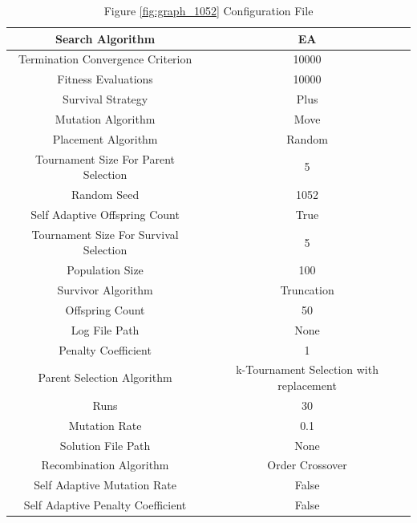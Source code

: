 \documentclass{standalone}
\begin{document}
\begin{table}[!htb]
	\centering
	\caption{Figure \ref{fig:graph_1052} Configuration File}
	\label{tab:graph_1052}
	\begin{tabular}{| c | c |}
		\hline
		Search Algorithm		& EA		 \\
		\hline
		Termination Convergence Criterion		& 10000		 \\
		\hline
		Fitness Evaluations		& 10000		 \\
		\hline
		Survival Strategy		& Plus		 \\
		\hline
		Mutation Algorithm		& Move		 \\
		\hline
		Placement Algorithm		& Random		 \\
		\hline
		Tournament Size For Parent Selection		& 5		 \\
		\hline
		Random Seed		& 1052		 \\
		\hline
		Self Adaptive Offspring Count		& True		 \\
		\hline
		Tournament Size For Survival Selection		& 5		 \\
		\hline
		Population Size		& 100		 \\
		\hline
		Survivor Algorithm		& Truncation		 \\
		\hline
		Offspring Count		& 50		 \\
		\hline
		Log File Path		& None		 \\
		\hline
		Penalty Coefficient		& 1		 \\
		\hline
		Parent Selection Algorithm		& k-Tournament Selection with replacement		 \\
		\hline
		Runs		& 30		 \\
		\hline
		Mutation Rate		& 0.1		 \\
		\hline
		Solution File Path		& None		 \\
		\hline
		Recombination Algorithm		& Order Crossover		 \\
		\hline
		Self Adaptive Mutation Rate		& False		 \\
		\hline
		Self Adaptive Penalty Coefficient		& False		 \\
		\hline
	\end{tabular}
\end{table}
\end{document}
